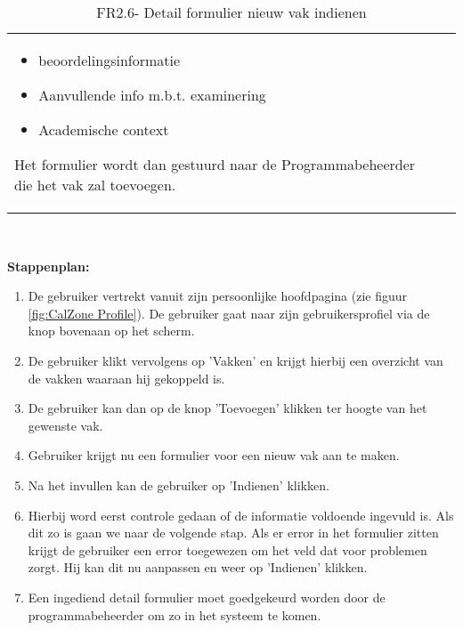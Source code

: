 \begin{table}[H]
\begin{tabular}{l | p{10cm}}
\begin{itemize}
                                        \item beoordelingsinformatie
                                        \item Aanvullende info m.b.t. examinering
                                        \item Academische context
                                        \end{itemize}
                                        Het formulier wordt dan gestuurd naar de Programmabeheerder die het vak zal toevoegen. 
            \end{tabular}\\
            \caption{FR2.6- Detail formulier nieuw vak indienen}
            \label{tab:FR2.6 - Detail formulier nieuw vak indienen}
        \end{table}
        
\textbf{Stappenplan:}
	\begin{enumerate}
	\item  De gebruiker vertrekt vanuit zijn persoonlijke hoofdpagina (zie figuur \ref{fig:CalZone Profile}). De gebruiker gaat naar zijn gebruikersprofiel via de knop bovenaan op het scherm.
	\item De gebruiker klikt vervolgens op 'Vakken' en krijgt hierbij een overzicht van de vakken waaraan hij gekoppeld is.
	\item De gebruiker kan dan op de knop 'Toevoegen' klikken ter hoogte van het gewenste vak.
	\item Gebruiker krijgt nu een formulier voor een nieuw vak aan te maken.
	\item Na het invullen kan de gebruiker op 'Indienen' klikken.
	\item Hierbij word eerst controle gedaan of de informatie voldoende ingevuld is. Als dit zo is gaan we naar de volgende stap. Als er error in het formulier zitten krijgt de gebruiker een error toegewezen om het veld dat voor problemen zorgt. Hij kan dit nu aanpassen en weer op 'Indienen' klikken.
	\item Een ingediend detail formulier moet goedgekeurd worden door de programmabeheerder om zo in het systeem te komen.
	\end{enumerate}

